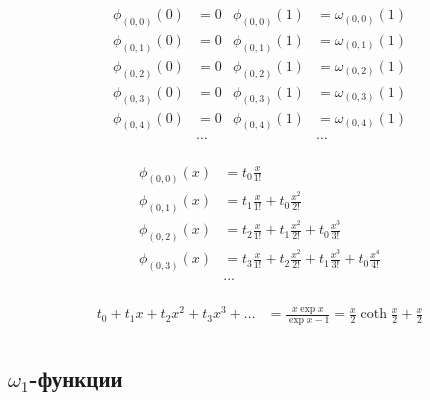 \begin{equation*} \begin{aligned}
\phi_{(0,0)}(0) &= 0 & \phi_{(0,0)}(1) &= \omega_{(0,0)}(1)
\\
\phi_{(0,1)}(0) &= 0 & \phi_{(0,1)}(1) &= \omega_{(0,1)}(1)
\\
\phi_{(0,2)}(0) &= 0 & \phi_{(0,2)}(1) &= \omega_{(0,2)}(1)
\\
\phi_{(0,3)}(0) &= 0 & \phi_{(0,3)}(1) &= \omega_{(0,3)}(1)
\\
\phi_{(0,4)}(0) &= 0 & \phi_{(0,4)}(1) &= \omega_{(0,4)}(1)
\\
&\ldots & &\ldots
\\
\end{aligned} \end{equation*}

\begin{equation*} \begin{aligned}
\phi_{(0,0)}(x) &= 
  t_0 \frac{x}{1!} 
\\
\phi_{(0,1)}(x) &= 
  t_1 \frac{x}{1!} 
+ t_0 \frac{x^2}{2!} 
\\
\phi_{(0,2)}(x) &= 
  t_2 \frac{x}{1!} 
+ t_1 \frac{x^2}{2!} 
+ t_0 \frac{x^3}{3!} 
\\
\phi_{(0,3)}(x) &= 
  t_3 \frac{x}{1!} 
+ t_2 \frac{x^2}{2!} 
+ t_1 \frac{x^3}{3!} 
+ t_0 \frac{x^4}{4!} 
\\
&\ldots
\\
\end{aligned} \end{equation*}

\begin{equation*} \begin{aligned}
  t_0
+ t_1 x
+ t_2 x^2
+ t_3 x^3
+ \ldots
&
= \frac{x \exp{x}}{\exp{x} - 1}
= \frac{x}{2} \coth{\frac{x}{2}} 
+ \frac{x}{2}
\\
\end{aligned} \end{equation*}

\subsection{$\omega_1$-функции}

